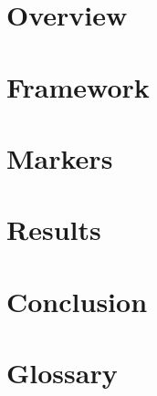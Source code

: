 \documentclass{thesis}
\begin{document}
\frontmatter
\maketitle
\clearpage
\impressum

\cleardoublepage
{}


\cleardoublepage


\tableofcontents

\mainmatter
\chapter{Overview}

\chapter{Framework}

\chapter{Markers}

\chapter{Results}

\chapter{Conclusion}

\let\cleardoublepage\clearpage
\chapter*{Glossary}


\appendix

\backmatter

\listoffigures
\listoftables


{\small

}

\clearpage
\erklaerung
\end{document}
